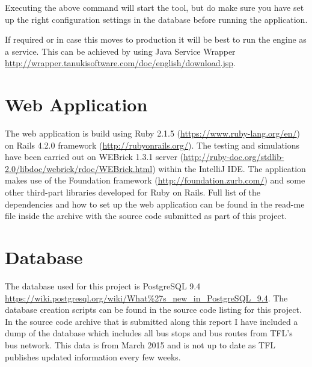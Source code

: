 Executing the above command will start the tool, but do make sure you have set up the right configuration settings in the database before running the application.

If required or in case this moves to production it will be best to run the engine as a service. This can be achieved by using Java Service Wrapper \url{http://wrapper.tanukisoftware.com/doc/english/download.jsp}.


\section{Web Application}

The web application is build using Ruby 2.1.5 (\url{https://www.ruby-lang.org/en/}) on Rails 4.2.0 framework (\url{http://rubyonrails.org/}). The testing and simulations have been carried out on WEBrick 1.3.1 server (\url{http://ruby-doc.org/stdlib-2.0/libdoc/webrick/rdoc/WEBrick.html}) within the IntelliJ IDE. The application makes use of the Foundation framework (\url{http://foundation.zurb.com/}) and some other third-part libraries developed for Ruby on Rails. Full list of the dependencies and how to set up the web application can be found in the read-me file inside the archive with the source code submitted as part of this project.

\section{Database}
The database used for this project is PostgreSQL 9.4 \url{https://wiki.postgresql.org/wiki/What\%27s_new_in_PostgreSQL_9.4}. The database creation scripts can be found in the source code listing for this project. In the source code archive that is submitted along this report I have included a dump of the database which includes all bus stops and bus routes from TFL's bus network. This data is from March 2015 and is not up to date as TFL publishes updated information every few weeks.